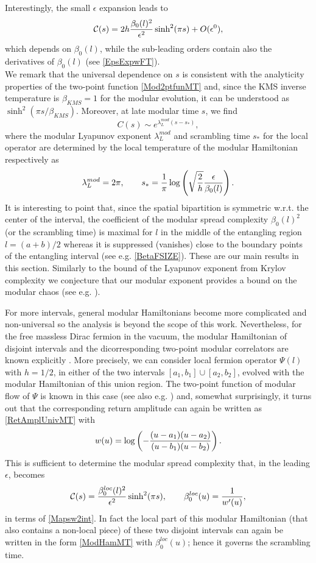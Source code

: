 \documentclass[aps,prl,twocolumn,showpacs,preprintnumbers,amsmath,amssymb]{revtex4-1}
\def\frac#1#2{{#1\over #2}}
\def\be{\begin{equation}}
\def\ee{\end{equation}}
\begin{document}
Interestingly, the small $\epsilon$ expansion leads to 
\be
\mathcal{C}(s)=2h\frac{\beta_0(l)^2}{\epsilon^2}\sinh^2(\pi s)+O(\epsilon^0),
\ee
which depends on $\beta_0(l)$, while the sub-leading orders contain also the derivatives of $\beta_0(l)$ (see \eqref{EpsExpwFT}).\\ 
We remark that the universal dependence on $s$ is consistent with the analyticity properties of the two-point function \eqref{Mod2ptfunMT} and, since the KMS inverse temperature is $\beta_{KMS} =1$ for the modular evolution,  it can be understood as $\sinh^2(\pi s/\beta_{KMS} )$. Moreover, at late modular time $s$, we find
\be
C(s)\sim e^{\lambda^{mod}_L\left(s-s_*\right)},
\ee
where the modular Lyapunov exponent $\lambda^{mod}_L$ and scrambling time  $s_*$ for the local operator are determined by the local temperature of the modular Hamiltonian respectively as
\be
\lambda^{mod}_L=2\pi,\qquad s_*=\frac{1}{\pi}\log\left(\sqrt{\frac{2}{h}}\frac{\epsilon}{\beta_0(l)}\right).
\ee
It is interesting to point that, since the spatial bipartition is symmetric w.r.t. the center of the interval, the coefficient of the modular spread complexity $\beta_0(l)^2$ (or the scrambling time) is maximal for $l$ in the middle of the entangling region $l=(a+b)/2$ whereas it is suppressed (vanishes) close to the boundary points of the entangling interval (see e.g. \eqref{BetaFSIZE}).
These are our main results in this section. Similarly to the bound of the Lyapunov exponent from Krylov complexity \cite{Parker:2018yvk,Gu:2021xaj} we conjecture that our modular exponent provides a bound on the modular chaos (see e.g. \cite{DeBoer:2019kdj}).

For more intervals, general modular Hamiltonians become more complicated and non-universal so the analysis is beyond the scope of this work. 
Nevertheless, for the free massless Dirac fermion in the vacuum, the modular Hamiltonian of disjoint intervals and the dicorresponding two-point modular correlators 
are known explicitly \cite{Casini:2009vk}. 
More precisely, we can consider local  fermion operator $\Psi(l)$ with $h=1/2$, in either of the two intervals $[a_1, b_1]\cup [a_2, b_2]$, evolved with the modular Hamiltonian of this union region. The two-point function of modular flow of $\Psi$ is known in this case \cite{Casini:2009vk, Longo:2009mn} (see also e.g. \cite{Hollands:2019hje}) 
and, somewhat surprisingly, it turns out that the corresponding return amplitude can again be written as \eqref{RetAmplUnivMT} with
\be
w(u)=\log\left(-\frac{(u-a_1)(u-a_2)}{(u-b_1)(u-b_2)}\right).\label{Mapsw2int}
\ee
This is sufficient to determine the modular spread complexity that, in the leading $\epsilon$, becomes 
\be
\mathcal{C}(s)=\frac{\beta^{loc}_0(l)^2}{\epsilon^2}\sinh^2(\pi s),\qquad \beta^{loc}_0(u)=\frac{1}{w'(u)},
\ee
in terms of \eqref{Mapsw2int}. In fact the local part of this modular Hamiltonian (that also contains a non-local piece) of these two disjoint intervals can again be written in the form \eqref{ModHamMT} with $\beta^{loc}_0(u)$; hence it governs the scrambling time. 
\end{document}
